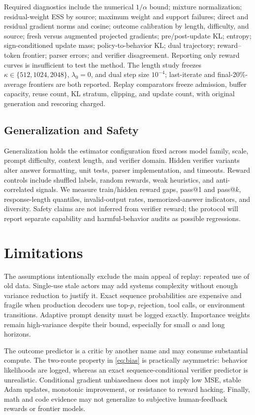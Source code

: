 \documentclass{article}
\begin{document}
Required diagnostics include the numerical $1/\alpha$ bound; mixture
normalization; residual-weight ESS by source; maximum weight and support
failures; direct and residual gradient norms and cosine; outcome calibration by
length, difficulty, and source; fresh versus augmented projected gradients;
pre/post-update KL; entropy; sign-conditioned update mass; policy-to-behavior
KL; dual trajectory; reward--token frontier; parser errors; and verifier
disagreement. Reporting only reward curves is insufficient to test the method.
The length study freezes
$\kappa\in\{512,1024,2048\}$, $\lambda_0=0$, and dual step size $10^{-4}$;
last-iterate and final-20\%-average frontiers are both reported. Replay
comparators freeze admission, buffer capacity, reuse count, KL stratum,
clipping, and update count, with original generation and rescoring charged.

\subsection{Generalization and Safety}

Generalization holds the estimator configuration fixed across model family,
scale, prompt difficulty, context length, and verifier domain. Hidden verifier
variants alter answer formatting, unit tests, parser implementation, and
timeouts. Reward controls include shuffled labels, random rewards, weak
heuristics, and anti-correlated signals. We measure train/hidden reward gaps,
pass@1 and pass@$k$, response-length quantiles, invalid-output rates,
memorized-answer indicators, and diversity. Safety claims are not inferred
from verifier reward; the protocol will report separate capability and
harmful-behavior audits as possible regressions.

\section{Limitations}
\label{sec:limitations}

The assumptions intentionally exclude the main appeal of replay: repeated use
of old data. Single-use stale actors may add systems complexity without enough
variance reduction to justify it. Exact sequence probabilities are expensive
and fragile when production decoders use top-$p$, rejection, tool calls, or
environment transitions. Adaptive prompt density must be logged exactly.
Importance weights remain high-variance despite their bound, especially for
small $\alpha$ and long horizons.

The outcome predictor is a critic by another name and may consume substantial
compute. The two-route property in \cref{eq:bias} is practically asymmetric:
behavior likelihoods are logged, whereas an exact sequence-conditional verifier
predictor is unrealistic. Conditional gradient unbiasedness does not imply
low MSE, stable Adam updates, monotonic improvement, or resistance to reward
hacking. Finally, math and code evidence may not generalize to subjective
human-feedback rewards or frontier models.
\end{document}
